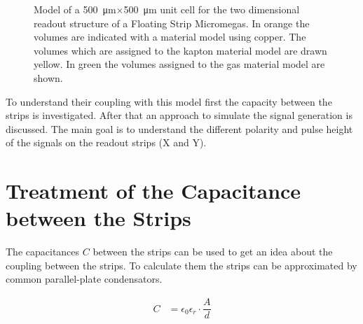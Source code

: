 \documentclass[
a4paper,                                %
twoside,                                %
BCOR1.4cm,                      %
10pt,                           %
headings=normal,                %
headsepline,                    %
clearplainpage, %
final,                                  %
div=14,
parskip=full,
openright,
bibliography=toc
]{scrreprt}
\begin{document}
\begin{figure}[H]
	\centering
	\caption{Model of a \SI{500}{\micro\m}$\times$\SI{500}{\micro\m} unit cell for the two dimensional readout structure of a Floating Strip Micromegas. In orange the volumes are indicated with a material model using copper. The volumes which are assigned to the kapton material model are drawn yellow. In green the volumes assigned to the gas material model are shown.}
	\label{fsmmUnitCellANSYS}
\end{figure}

To understand their coupling with this model first the capacity between the strips is investigated. After that an approach to simulate the signal generation is discussed. The main goal is to understand the different polarity and pulse height of the signals on the readout strips (X and Y).

\section{Treatment of the Capacitance between the Strips}

The capacitances $C$ between the strips can be used to get an idea about the coupling between the strips. 
To calculate them the strips can be approximated by common parallel-plate condensators.

\begin{align}\label{plateCapa}
	C &= \epsilon_{0} \epsilon_{r} \cdot \dfrac{A}{d}
\end{align}
\end{document}
